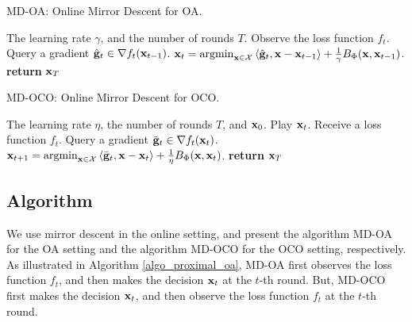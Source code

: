 \documentclass[journal]{IEEEtran}
\begin{document}
\begin{algorithm}[!t]
   \caption{ MD-OA: Online Mirror Descent for OA.}
   \label{algo_proximal_oa}
   \begin{algorithmic}[1]
   \Require The learning rate $\gamma$, and the number of rounds $T$.
            \State Observe the loss function $f_t$. 
            \State Query a gradient $\hat{{\bf g}}_t \in \nabla f_{t}({\bf x}_{t-1})$.
            \State $\x_t = \argmin_{\x \in \Xcal} \lrangle{\hat{\g}_t, \x - \x_{t-1}} + \frac{1}{\gamma}B_{\Phi}(\x, \x_{t-1})$. 
       \EndFor
       \State \textbf{return} ${\bf x}_{T}$
   \end{algorithmic}
\end{algorithm}



\begin{algorithm}[!t]
   \caption{ MD-OCO: Online Mirror Descent for OCO.}
   \label{algo_proximal_oco}
   \begin{algorithmic}[1]
   \Require The learning rate $\eta$, the number of rounds $T$, and ${\bf x}_0$.
        \State Play ${\bf x}_t$. 
        \State Receive a loss function $f_t$.
        \State Query a gradient $\bar{{\bf g}}_t \in \nabla f_t({\bf x}_t)$.
        \State $\x_{t+1} = \argmin_{\x \in \Xcal} \lrangle{\bar{\g}_t, \x - \x_t} + \frac{1}{\eta}B_{\Phi}(\x, \x_t)$. 
       \EndFor
       \State \textbf{return} ${\bf x}_{T}$
   \end{algorithmic}
\end{algorithm}






\subsection{Algorithm}

We use mirror descent \cite{BECK2003167} in the online setting, and present the algorithm MD-OA for the OA setting and the algorithm MD-OCO for the OCO setting, respectively. As illustrated in Algorithm \ref{algo_proximal_oa}, MD-OA first observes the loss function $f_t$, and then makes the decision ${\bf x}_t$ at the $t$-th round.  But, MD-OCO first makes the decision ${\bf x}_t$, and then observe the loss function $f_t$  at the $t$-th round. 
\end{document}
